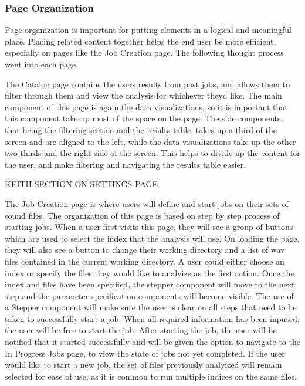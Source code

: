 \subsubsection{Page Organization}
Page organization is important for putting elements in a logical and meaningful place. Placing related content together helps the end user be more efficient, especially on pages like the Job Creation page. The following thought process went into each page.\par
The Catalog page contains the user\textquotesingle s results from past jobs, and allows them to filter through them and view the analysis for whichever they\textquotesingle d like. The main component of this page is again the data visualizations, so it is important that this component take up most of the space on the page. The side components, that being the filtering section and the results table, takes up a third of the screen and are aligned to the left, while the data visualizations take up the other two thirds and the right side of the screen. This helps to divide up the content for the user, and make filtering and navigating the results table easier.\par
KEITH SECTION ON SETTINGS PAGE\par
The Job Creation page is where user\textquotesingle s will define and start jobs on their sets of sound files. The organization of this page is based on step by step process of starting jobs. When a user first visits this page, they will see a group of buttons which are used to select the index that the analysis will use. On loading the page, they will also see a button to change their working directory and a list of wav files contained in the current working directory. A user could either choose an index or specify the files they would like to analyize as the first action. Once the index and files have been specified, the stepper component will move to the next step and the parameter specification components will become visible. The use of a Stepper component will make sure the user is clear on all steps that need to be taken to successfully start a job. When all required information has been inputed, the user will be free to start the job. After starting the job, the user will be notified that it started successfully and will be given the option to navigate to the In Progress Jobs page, to view the state of jobs not yet completed. If the user would like to start a new job, the set of files previously analyized will remain selected for ease of use, as it is common to run multiple indices on the same files. 

